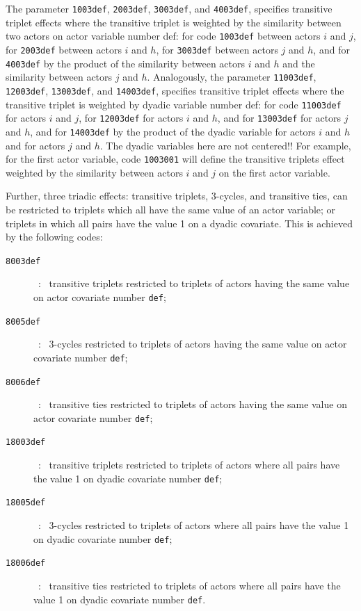 \documentclass[a4paper,fleqn,11pt]{article}
\newcommand{\+}{\, + \,}
\begin{document}
{The parameter \texttt{1003def}, \texttt{2003def}, \texttt{3003def},
and \texttt{4003def},
specifies transitive triplet effects where the transitive triplet
is weighted by the similarity between two actors
on actor variable number \textsf{def}:
for code \texttt{1003def} between actors $i$ and $j$,
for \texttt{2003def} between actors $i$ and $h$,
for \texttt{3003def} between actors $j$ and $h$, and
for \texttt{4003def} by the product of the similarity
between actors $i$ and $h$
and the similarity between actors $j$ and $h$.
Analogously, the parameter \texttt{11003def}, \texttt{12003def},
\texttt{13003def},
and \texttt{14003def},
specifies transitive triplet effects where the transitive triplet
is weighted by dyadic variable number \textsf{def}:
for code \texttt{11003def} for actors $i$ and $j$,
for \texttt{12003def} for actors $i$ and $h$, and
for \texttt{13003def} for actors $j$ and $h$, and
for \texttt{14003def} by the product of the
dyadic variable for actors $i$ and $h$
and for actors $j$ and $h$.
The dyadic variables here are not centered!!
For example, for the first actor variable,
code \texttt{1003001} will define the transitive triplets
effect weighted by the similarity between actors $i$ and $j$
on the first actor variable.
\bigskip

Further, three triadic effects: transitive triplets, 3-cycles,
and transitive ties, can be restricted to triplets which all have the
same value of an actor variable; or triplets in which all pairs
have the value 1 on a dyadic covariate.
This is achieved by the following codes:
\begin{description}
\item[\texttt{8003def}]\ : \ transitive triplets
                         restricted to triplets of actors
                        having the same value on actor
                        covariate number \texttt{def};
\item[\texttt{8005def}]\ : \  3-cycles restricted to triplets of actors
                        having the same value
                        on actor covariate number \texttt{def};
\item[\texttt{8006def}]\ : \  transitive ties restricted to triplets of actors
                        having the same value
                        on actor covariate number \texttt{def};
\item[\texttt{18003def}]\ : \  transitive triplets restricted
                        to triplets of actors
                        where all pairs have the value 1
                        on dyadic covariate number \texttt{def};
\item[\texttt{18005def}]\ : \  3-cycles restricted to triplets of actors
                        where all pairs have the value 1
                        on dyadic covariate number \texttt{def};
\item[\texttt{18006def}]\ : \  transitive ties restricted to
                        triplets of actors
                        where all pairs have the value 1
                        on dyadic covariate number \texttt{def}.
\end{description}


}
\end{document}
